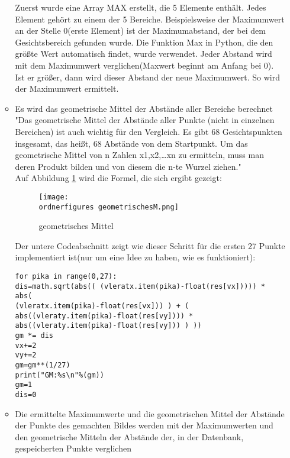 \begin{enumerate}
\begin{itemize}
	Zuerst wurde eine Array MAX erstellt, die 5 Elemente enthält. Jedes Element gehört zu einem der 5 Bereiche. Beispielsweise der Maximumwert an der Stelle 0(erste Element) ist der Maximumabstand, der bei dem Gesichtsbereich gefunden wurde. Die Funktion Max in Python, die den größte Wert automatisch findet, wurde verwendet. Jeder Abstand wird mit dem Maximumwert verglichen(Maxwert beginnt am Anfang bei 0). Ist er größer, dann wird dieser Abstand der neue Maximumwert. So wird der Maximumwert ermittelt.
	
	\item Es wird das geometrische Mittel der Abstände aller Bereiche berechnet \\
	
	"Das geometrische Mittel der Abstände aller Punkte (nicht in einzelnen Bereichen) ist auch wichtig für den Vergleich. Es gibt 68 Gesichtspunkten insgesamt, das heißt, 68 Abstände von dem Startpunkt. 
	Um das geometrische Mittel von n Zahlen x1,x2,…xn zu ermitteln, muss man deren Produkt bilden und von diesem die n-te Wurzel ziehen."\cite{geometrischesM}\\
	
	Auf Abbildung \ref{fig:geometrischesM} wird die Formel, die sich ergibt gezeigt:
	
	\begin{figure}[H]
		\centering
		\texttt{[image: \\ordnerfigures geometrischesM.png]}
		\caption{geometrisches Mittel}
		\label{fig:geometrischesM}
	\end{figure}

	Der untere Codeabschnitt zeigt wie dieser Schritt für die ersten 27 Punkte implementiert ist(nur um eine Idee zu haben, wie es funktioniert):\\
	
\begin{lstlisting}
for pika in range(0,27):
dis=math.sqrt(abs(( (vleratx.item(pika)-float(res[vx])))) * abs( 
(vleratx.item(pika)-float(res[vx])) ) + ( 
abs((vleraty.item(pika)-float(res[vy]))) * 
abs((vleraty.item(pika)-float(res[vy])) ) ))
gm *= dis
vx+=2
vy+=2
gm=gm**(1/27)    
print("GM:%s\n"%(gm))
gm=1
dis=0
\end{lstlisting}
	
	\item Die ermittelte Maximumwerte und die geometrischen Mittel der Abstände der Punkte des gemachten Bildes werden mit der Maximumwerten und den geometrische Mitteln der Abstände der, in der Datenbank, gespeicherten Punkte verglichen \\
	

\end{itemize}
\end{enumerate}
